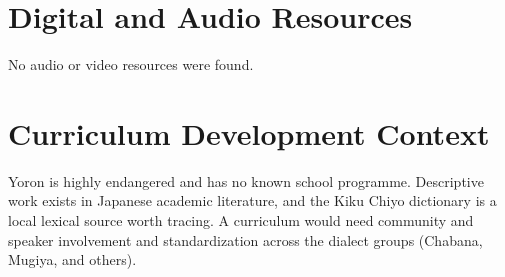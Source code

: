 \documentclass[12pt]{article}
\begin{document}
\section{Digital and Audio Resources}
No audio or video resources were found.

\section{Curriculum Development Context}
Yoron is highly endangered and has no known school programme. Descriptive work exists in Japanese academic literature, and the Kiku Chiyo dictionary is a local lexical source worth tracing. A curriculum would need community and speaker involvement and standardization across the dialect groups (Chabana, Mugiya, and others).
\end{document}
